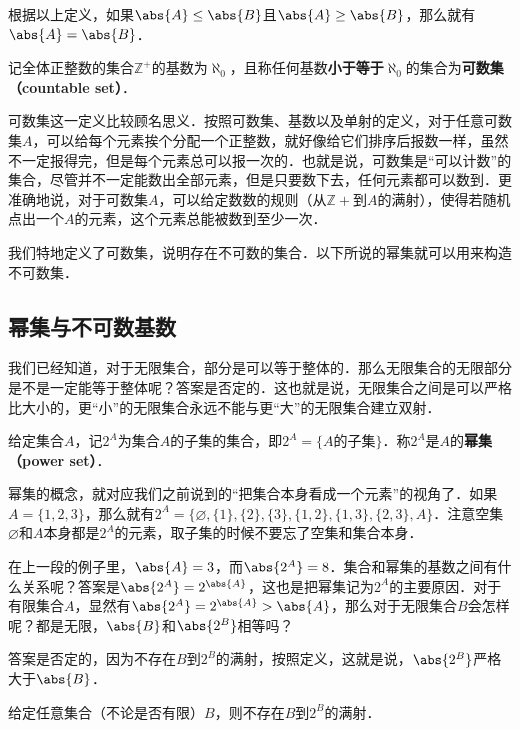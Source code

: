 根据以上定义，如果$\abs{A}\leq\abs{B}$且$\abs{A}\geq\abs{B}$，那么就有$\abs{A}=\abs{B}$．

\begin{definition}
记全体正整数的集合$\mathbb{Z}^+$的基数为$\aleph_0$，且称任何基数\textbf{小于等于}$\aleph_0$的集合为\textbf{可数集（countable set）}．
\end{definition}

可数集这一定义比较顾名思义．按照可数集、基数以及单射的定义，对于任意可数集$A$，可以给每个元素挨个分配一个正整数，就好像给它们排序后报数一样，虽然不一定报得完，但是每个元素总可以报一次的．也就是说，可数集是“可以计数”的集合，尽管并不一定能数出全部元素，但是只要数下去，任何元素都可以数到．更准确地说，对于可数集$A$，可以给定数数的规则（从$\mathbb{Z}+$到$A$的满射），使得若随机点出一个$A$的元素，这个元素总能被数到至少一次．

我们特地定义了可数集，说明存在不可数的集合．以下所说的幂集就可以用来构造不可数集．


\subsection{幂集与不可数基数}

我们已经知道，对于无限集合，部分是可以等于整体的．那么无限集合的无限部分是不是一定能等于整体呢？答案是否定的．这也就是说，无限集合之间是可以严格比大小的，更“小”的无限集合永远不能与更“大”的无限集合建立双射．

\begin{definition}
给定集合$A$，记$2^A$为集合$A$的子集的集合，即$2^A=\{A\text{的子集}\}$．称$2^A$是$A$的\textbf{幂集（power set）}．
\end{definition}

幂集的概念，就对应我们之前说到的“把集合本身看成一个元素”的视角了．如果$A=\{1,2,3\}$，那么就有$2^A=\{\varnothing, \{1\}, \{2\}, \{3\}, \{1,2\}, \{1,3\}, \{2,3\}, A\}$．注意空集$\varnothing$和$A$本身都是$2^A$的元素，取子集的时候不要忘了空集和集合本身．

在上一段的例子里，$\abs{A}=3$，而$\abs{2^A}=8$．集合和幂集的基数之间有什么关系呢？答案是$\abs{2^A}=2^{\abs{A}}$，这也是把幂集记为$2^A$的主要原因．对于有限集合$A$，显然有$\abs{2^A}=2^{\abs{A}}>\abs{A}$，那么对于无限集合$B$会怎样呢？都是无限，$\abs{B}$和$\abs{2^B}$相等吗？

答案是否定的，因为不存在$B$到$2^B$的满射，按照定义，这就是说，$\abs{2^B}$严格大于$\abs{B}$．

\begin{theorem}
给定任意集合（不论是否有限）$B$，则不存在$B$到$2^B$的满射．
\end{theorem}

